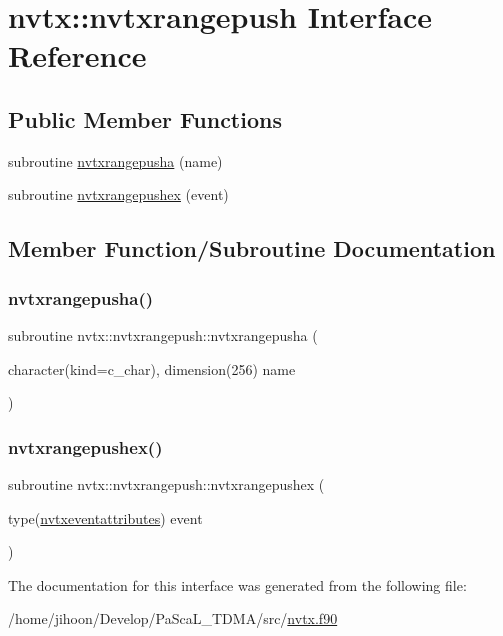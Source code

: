 \hypertarget{interfacenvtx_1_1nvtxrangepush}{}\section{nvtx\+:\+:nvtxrangepush Interface Reference}
\label{interfacenvtx_1_1nvtxrangepush}
\subsection*{Public Member Functions}
\begin{DoxyCompactItemize}
\item 
subroutine \hyperlink{interfacenvtx_1_1nvtxrangepush_a9b89d40371882183ffd7f3c6afb7c32a}{nvtxrangepusha} (name)
\item 
subroutine \hyperlink{interfacenvtx_1_1nvtxrangepush_ab940fa7d62630e799d93f4a6bbe64fd7}{nvtxrangepushex} (event)
\end{DoxyCompactItemize}


\subsection{Member Function/\+Subroutine Documentation}
\mbox{\label{interfacenvtx_1_1nvtxrangepush_a9b89d40371882183ffd7f3c6afb7c32a}} 
\subsubsection{\texorpdfstring{nvtxrangepusha()}{nvtxrangepusha()}}
{\footnotesize\ttfamily subroutine nvtx\+::nvtxrangepush\+::nvtxrangepusha (\begin{DoxyParamCaption}\item[{character(kind=c\+\_\+char), dimension(256)}]{name }\end{DoxyParamCaption})}

\mbox{\label{interfacenvtx_1_1nvtxrangepush_ab940fa7d62630e799d93f4a6bbe64fd7}} 
\subsubsection{\texorpdfstring{nvtxrangepushex()}{nvtxrangepushex()}}
{\footnotesize\ttfamily subroutine nvtx\+::nvtxrangepush\+::nvtxrangepushex (\begin{DoxyParamCaption}\item[{type(\hyperlink{structnvtx_1_1nvtxeventattributes}{nvtxeventattributes})}]{event }\end{DoxyParamCaption})}



The documentation for this interface was generated from the following file\+:\begin{DoxyCompactItemize}
\item 
/home/jihoon/\+Develop/\+Pa\+Sca\+L\+\_\+\+T\+D\+M\+A/src/\hyperlink{nvtx_8f90}{nvtx.\+f90}\end{DoxyCompactItemize}
